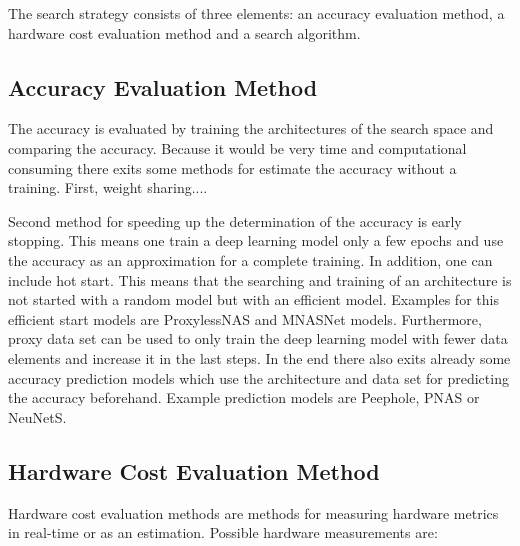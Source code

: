 \documentclass[conference]{IEEEtran}
\begin{document}
The search strategy consists of three elements: an accuracy evaluation method, a hardware cost evaluation method and a search algorithm. 

\subsection{Accuracy Evaluation Method}
The accuracy is evaluated by training the architectures of the search space and comparing the accuracy. Because it would be very time and computational consuming there exits some methods for estimate the accuracy without a training. First, weight sharing....

Second method for speeding up the determination of the accuracy is early stopping. This means one train a deep learning model only a few epochs and use the accuracy as an approximation for a complete training. In addition, one can include hot start. This means that the searching and training of an architecture is not started with a random model but with an efficient model. Examples for this efficient start models are ProxylessNAS and MNASNet models. Furthermore, proxy data set can be used to only train the deep learning model with fewer data elements and increase it in the last steps. In the end there also exits already some accuracy prediction models which use the architecture and data set for predicting the accuracy beforehand. Example prediction models are Peephole, PNAS or NeuNetS. 

\subsection{Hardware Cost Evaluation Method}
Hardware cost evaluation methods are methods for measuring hardware metrics in real-time or as an estimation. Possible hardware measurements are: 
\end{document}
